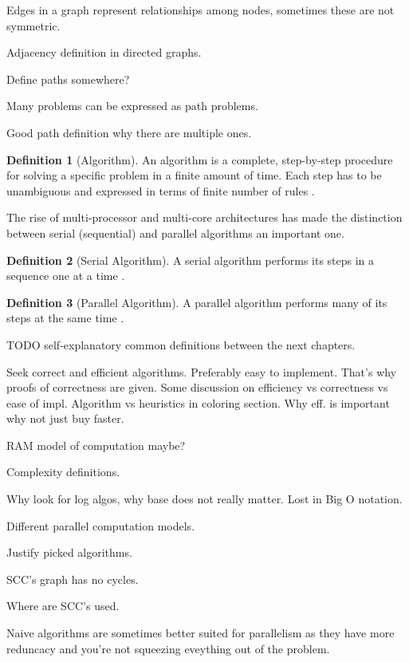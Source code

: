 \documentclass{report}
\theoremstyle{plain}
\theoremstyle{definition}
\newtheorem{definition}{Definition}
\theoremstyle{remark}
\numberwithin{definition}{chapter}
\numberwithin{example}{chapter}
\numberwithin{figure}{chapter}
\begin{document}
Edges in a graph represent relationships among nodes, sometimes these are not symmetric.

Adjacency definition in directed graphs.

Define paths somewhere?

Many problems can be expressed as path problems.

Good path definition why there are multiple ones.

\begin{definition}[Algorithm]
An algorithm is a complete, step-by-step procedure for solving a specific problem in a finite amount of time. Each step has to be unambiguous and expressed in terms of finite number of rules \cite{berman1996fundamentals}.
\end{definition}

The rise of multi-processor and multi-core architectures has made the distinction between serial (sequential) and parallel algorithms an important one.

\begin{definition}[Serial Algorithm]
A serial algorithm performs its steps in a sequence one at a time \cite{berman1996fundamentals}.
\end{definition}

\begin{definition}[Parallel Algorithm]
A parallel algorithm performs many of its steps at the same time \cite{berman1996fundamentals}.
\end{definition}

TODO self-explanatory common definitions between the next chapters.

Seek correct and efficient algorithms. Preferably easy to implement. That's why proofs of correctness are given.
Some discussion on efficiency vs correctness vs ease of impl.
Algorithm vs heuristics in coloring section.
Why eff. is important why not just buy faster.

RAM model of computation maybe?

Complexity definitions.

Why look for log algos, why base does not really matter. Lost in Big O notation.

Different parallel computation models.

Justify picked algorithms.



SCC's graph has no cycles.

Where are SCC's used.

Naive algorithms are sometimes better suited for parallelism as they have more reduncacy and you're not squeezing eveything out of the problem.
\end{document}
